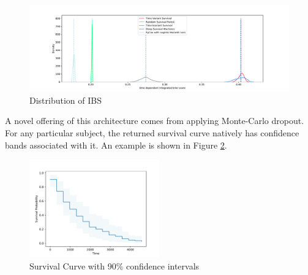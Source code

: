 \documentclass[%
 reprint,
 amsmath,amssymb,
 aps,nofootinbib
]{revtex4-2}
\begin{document}
\begin{figure}[h]
  \centering
  \includegraphics[width=\textwidth]{ibs_score_dist_plot.pdf}
  \caption{Distribution of IBS}
  \label{fig:ibs}
\end{figure}


A novel offering of this architecture comes from applying Monte-Carlo dropout. For any particular subject, the returned survival curve natively has confidence bands associated with it. An example is shown in Figure \ref{fig:example_survival_graph}.

\begin{figure}[h]
  \centering
  \includegraphics[width=0.5\textwidth]{example_survival_graph.pdf}
  \caption{Survival Curve with 90\% confidence intervals}
  \label{fig:example_survival_graph}
\end{figure}
\end{document}
